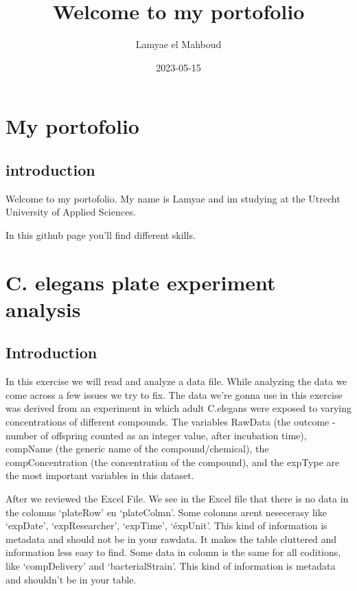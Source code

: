 \documentclass[
]{book}
\title{Welcome to my portofolio}
\author{Lamyae el Mahboud}
\date{2023-05-15}
\begin{document}
\maketitle

{
\setcounter{tocdepth}{1}
\tableofcontents
}
\hypertarget{my-portofolio}{%
\chapter{My portofolio}\label{my-portofolio}}

\hypertarget{introduction}{%
\section{introduction}\label{introduction}}

Welcome to my portofolio. My name is Lamyae and im studying at the Utrecht University of Applied Sciences.

In this github page you'll find different skills.

\hypertarget{c.-elegans-plate-experiment-analysis}{%
\chapter{C. elegans plate experiment analysis}\label{c.-elegans-plate-experiment-analysis}}

\hypertarget{introduction-1}{%
\section{Introduction}\label{introduction-1}}

In this exercise we will read and analyze a data file. While analyzing the data we come across a few issues we try to fix. The data we're gonna use in this exercise was derived from an experiment in which adult C.elegans were exposed to varying concentrations of different compounds. The variables RawData (the outcome - number of offspring counted as an integer value, after incubation time), compName (the generic name of the compound/chemical), the compConcentration (the concentration of the compound), and the expType are the most important variables in this dataset.

After we reviewed the Excel File. We see in the Excel file that there is no data in the colomns `plateRow' en `plateColmn'.
Some colomns arent nesecerasy like `expDate', `expResearcher', `expTime', `éxpUnit'. This kind of information is metadata and should not be in your rawdata. It makes the table cluttered and information less easy to find.
Some data in colomn is the same for all coditions, like `compDelivery' and `bacterialStrain'. This kind of information is metadata and shouldn't be in your table.
\end{document}
